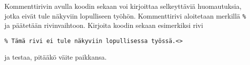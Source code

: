     \begin{harj}
        Kommenttirivin avulla koodin sekaan voi kirjoittaa selkeyttäviä huomautuksia, jotka eivät tule näkyviin lopulliseen työhön. Kommenttirivi aloitetaan merkillä \lstinline-%- ja päätetään rivinvaihtoon. 
        \vaihto
        Kirjoita koodin sekaan esimerkiksi rivi
        \begin{lstlisting}
% Tämä rivi ei tule näkyviin lopullisessa työssä.<>
        \end{lstlisting}
        ja testaa, pitääkö väite paikkansa.
    \end{harj}
